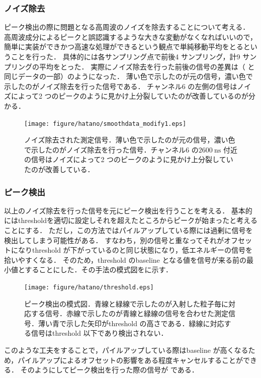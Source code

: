 \subsubsection{ノイズ除去}
ピーク検出の際に問題となる高周波のノイズを除去することについて考える．
高周波成分によるピークと誤認識するような大きな変動がなくなればいいので，簡単に実装ができかつ高速な処理ができるという観点で単純移動平均をとるということを行った．
具体的には各サンプリング点で前後4 サンプリング，計9 サンプリングの平均をとった．
実際にノイズ除去を行った前後の信号の差異は（ と同じデータの一部）のようになった．
薄い色で示したのが元の信号，濃い色で示したのがノイズ除去を行った信号である．
チャンネル6 の左側の信号はノイズによって2 つのピークのように見かけ上分裂していたのが改善しているのが分かる．

\begin{figure}[hbt]
\centering
\texttt{[image: figure/hatano/smoothdata\_modify1.eps]}
\caption{ノイズ除去された測定信号．薄い色で示したのが元の信号，濃い色で示したのがノイズ除去を行った信号．チャンネル6 の$2600~\mathrm{ns}$ 付近の信号はノイズによって2 つのピークのように見かけ上分裂していたのが改善している．}
\label{hatano_fig:smoothdata}
\end{figure}

\subsubsection{ピーク検出}
以上のノイズ除去を行った信号を元にピーク検出を行うことを考える．
基本的にはthresholdを適切に設定しそれを超えたところからピークが始まったと考えることにする．
ただし，この方法ではパイルアップしている際には過剰に信号を検出してしまう可能性がある．
すなわち，別の信号と重なってそれがオフセットになりthreshold が下がっているのと同じ状態になり，低エネルギーの信号を拾いやすくなる．
そのため，threshold のbaseline となる値を信号が来る前の最小値とすることにした．その手法の模式図をに示す．

\begin{figure}[hbt]
\centering
\texttt{[image: figure/hatano/threshold.eps]}
\caption{ピーク検出の模式図．青線と緑線で示したのが入射した粒子毎に対応する信号．赤線で示したのが青線と緑線の信号を合わせた測定信号．薄い青で示した矢印がthreshold の高さである．緑線に対応する信号はthreshold 以下であり検出されない．}
\label{hatano_fig:threshold}
\end{figure}

このような工夫をすることで，パイルアップしている際はbaseline が高くなるため，パイルアップによるオフセットの影響をある程度キャンセルすることができる．
そのようにしてピーク検出を行った際の信号が である．

